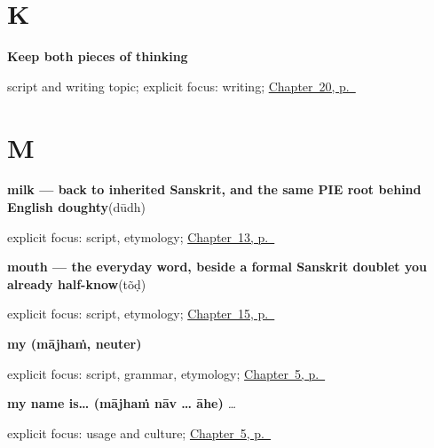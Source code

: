 \section*{K}

\noindent\begin{minipage}[t]{\linewidth}
\raggedright
\textbf{Keep both pieces of thinking}\par
\footnotesize script and writing topic; explicit focus: writing; \hyperref[ch:mr-a1-named-reader-message]{Chapter~20, p.~\pageref*{ch:mr-a1-named-reader-message}}
\end{minipage}\par\smallskip

\section*{M}

\noindent\begin{minipage}[t]{\linewidth}
\raggedright
\textbf{milk — back to inherited Sanskrit, and the same PIE root behind English doughty}\enspace\emph{}\enspace(dūdh)\par
\footnotesize explicit focus: script, etymology; \hyperref[ch:mr-request-food-drink]{Chapter~13, p.~\pageref*{ch:mr-request-food-drink}}
\end{minipage}\par\smallskip

\noindent\begin{minipage}[t]{\linewidth}
\raggedright
\textbf{mouth — the everyday word, beside a formal Sanskrit doublet you already half-know}\enspace\emph{}\enspace(tõḍ)\par
\footnotesize explicit focus: script, etymology; \hyperref[ch:mr-face-parts]{Chapter~15, p.~\pageref*{ch:mr-face-parts}}
\end{minipage}\par\smallskip

\noindent\begin{minipage}[t]{\linewidth}
\raggedright
\textbf{my (mājhaṁ, neuter)}\enspace\emph{}\par
\footnotesize explicit focus: script, grammar, etymology; \hyperref[ch:introductions]{Chapter~5, p.~\pageref*{ch:introductions}}
\end{minipage}\par\smallskip

\noindent\begin{minipage}[t]{\linewidth}
\raggedright
\textbf{my name is… (mājhaṁ nāv … āhe)}\enspace\emph{  … }\par
\footnotesize explicit focus: usage and culture; \hyperref[ch:introductions]{Chapter~5, p.~\pageref*{ch:introductions}}
\end{minipage}\par\smallskip

